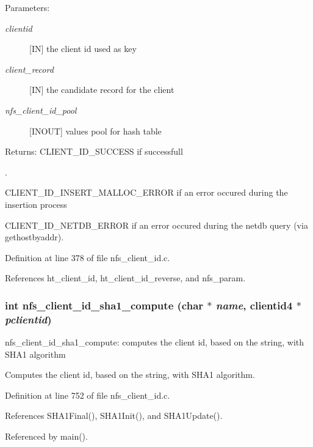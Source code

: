 \begin{Desc}
\item[Parameters:]
\begin{description}
\item[{\em clientid}][IN] the client id used as key \item[{\em client\_\-record}][IN] the candidate record for the client \item[{\em nfs\_\-client\_\-id\_\-pool}][INOUT] values pool for hash table\end{description}
\end{Desc}
\begin{Desc}
\item[Returns:]CLIENT\_\-ID\_\-SUCCESS if successfull\par
. 

CLIENT\_\-ID\_\-INSERT\_\-MALLOC\_\-ERROR if an error occured during the insertion process \par
 

CLIENT\_\-ID\_\-NETDB\_\-ERROR if an error occured during the netdb query (via gethostbyaddr). \end{Desc}


Definition at line 378 of file nfs\_\-client\_\-id.c.

References ht\_\-client\_\-id, ht\_\-client\_\-id\_\-reverse, and nfs\_\-param.
\subsubsection{\setlength{\rightskip}{0pt plus 5cm}int nfs\_\-client\_\-id\_\-sha1\_\-compute (char $\ast$ {\em name}, clientid4 $\ast$ {\em pclientid})}\label{nfs__client__id_8c_a21}


nfs\_\-client\_\-id\_\-sha1\_\-compute: computes the client id, based on the string, with SHA1 algorithm

Computes the client id, based on the string, with SHA1 algorithm. 

Definition at line 752 of file nfs\_\-client\_\-id.c.

References SHA1Final(), SHA1Init(), and SHA1Update().

Referenced by main().
